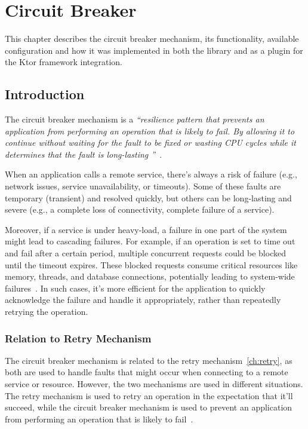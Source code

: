 \chapter{Circuit Breaker}\label{ch:circuit-breaker}

This chapter describes the circuit breaker mechanism, its functionality, available configuration and how it was implemented in both the library and as a plugin for the Ktor framework integration.


\section{Introduction}\label{sec:cbreaker-introduction}

The circuit breaker mechanism is a \textit{\enquote{resilience pattern
that prevents an application from performing an operation that is likely to fail.
By allowing it
to continue
without waiting for the fault to be fixed or wasting CPU cycles while it determines that the fault is long-lasting
}}~\cite{microsoft-cbreaker-pattern}.

When an application calls a remote service, there's always a risk of failure
(e.g., network issues, service unavailability, or timeouts).
Some of these faults are temporary (transient) and resolved quickly,
but others can be long-lasting and severe (e.g., a complete loss of connectivity, complete failure of a service).

Moreover, if a service is under heavy-load, a failure in one part of the system might lead to cascading failures.
For example, if an operation is set to time out and fail after a certain period, multiple concurrent requests could be blocked until the timeout expires.
These blocked requests consume critical resources like memory, threads, and database connections, potentially leading to system-wide failures~\cite{microsoft-cbreaker-pattern}.
In such cases, it’s more efficient for the application to quickly acknowledge the failure and handle it appropriately, rather than repeatedly retrying the operation.

\subsection{Relation to Retry Mechanism}\label{subsec:cbreaker-relation-to-retry}

The circuit breaker mechanism is related to the retry mechanism~\ref{ch:retry}, as both are used to handle faults that might occur when connecting to a remote service or resource.
However, the two mechanisms are used in different situations.
The retry mechanism is used to retry an operation in the expectation that it'll succeed, while the circuit breaker mechanism is used to prevent an application from performing an operation that is likely to fail~\cite{microsoft-cbreaker-pattern}.

